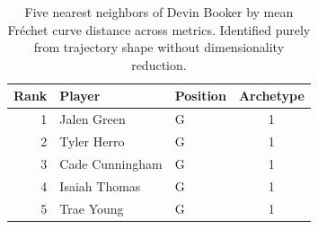 \begin{table}[htbp]
  \centering\small
  \begin{tabular}{rllc}
    \toprule
    Rank & Player & Position & Archetype \\
    \midrule
    1 & Jalen Green & G & 1 \\
    2 & Tyler Herro & G & 1 \\
    3 & Cade Cunningham & G & 1 \\
    4 & Isaiah Thomas & G & 1 \\
    5 & Trae Young & G & 1 \\
    \bottomrule
  \end{tabular}
  \caption{Five nearest neighbors of Devin Booker by mean Fr\'{e}chet curve distance across metrics. Identified purely from trajectory shape without dimensionality reduction.}
  \label{tab:Devin_Booker_frechet_curve_neighbors}
\end{table}

